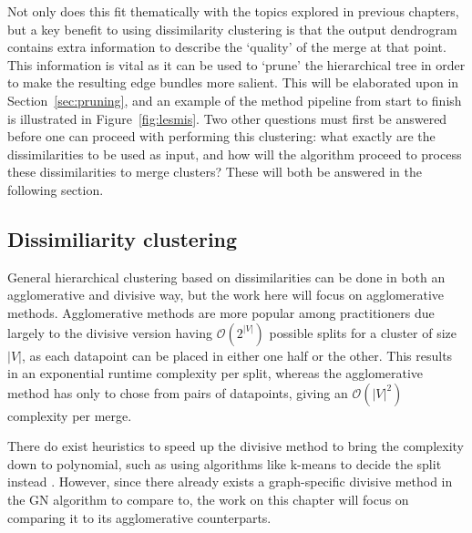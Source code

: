 Not only does this fit thematically with the topics explored in previous chapters, but a key benefit to using dissimilarity clustering is that the output dendrogram contains extra information to describe the `quality' of the merge at that point. This information is vital as it can be used to `prune' the hierarchical tree in order to make the resulting edge bundles more salient. This will be elaborated upon in Section~\ref{sec:pruning}, and an example of the method pipeline from start to finish is illustrated in Figure~\ref{fig:lesmis}.
Two other questions must first be answered before one can proceed with performing this clustering: what exactly are the dissimilarities to be used as input, and how will the algorithm proceed to process these dissimilarities to merge clusters? These will both be answered in the following section.

\subsection{Dissimiliarity clustering}
\label{sec:dissimilarities}
General hierarchical clustering based on dissimilarities can be done in both an agglomerative and divisive way, but the work here will focus on agglomerative methods. Agglomerative methods are more popular among practitioners \cite{Roux2018} due largely to the divisive version having $\mathcal{O}(2^{|V|})$ possible splits for a cluster of size $|V|$, as each datapoint can be placed in either one half or the other. This results in an exponential runtime complexity per split, whereas the agglomerative method has only to chose from pairs of datapoints, giving an $\mathcal{O}(|V|^2)$ complexity per merge.

There do exist heuristics to speed up the divisive method to bring the complexity down to polynomial, such as using algorithms like k-means to decide the split instead \cite{Lamrous2006}.
However, since there already exists a graph-specific divisive method in the GN algorithm to compare to, the work on this chapter will focus on comparing it to its agglomerative counterparts.

